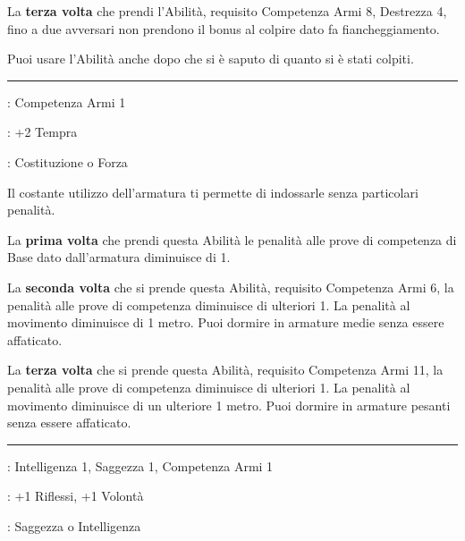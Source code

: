 \begin{multicols}{2}
La \textbf{terza volta} che prendi l'Abilità, requisito Competenza Armi 8, Destrezza 4, fino a due avversari non prendono il bonus al colpire dato fa fiancheggiamento.

Puoi usare l'Abilità anche dopo che si è saputo di quanto si è stati colpiti.

\smallskip\noindent\rule{\linewidth}{2pt} \hypertarget{Seconda pelle}{}\medskip{}
\noindent
\begin{description}[noitemsep, topsep=0pt, parsep=0pt, partopsep=0pt, leftmargin=0cm, labelwidth=2.5cm]
    \item[\textbf{Requisito}]: Competenza Armi 1
    \item[\textbf{Tiri Salvezza}]: +2 Tempra
    \item[\textbf{Caratteristica}]: Costituzione o Forza
\end{description}

Il costante utilizzo dell'armatura ti permette di indossarle senza particolari penalità.

La \textbf{prima volta} che prendi questa Abilità le penalità alle prove di competenza di Base dato dall'armatura diminuisce di 1.

La \textbf{seconda volta} che si prende questa Abilità, requisito Competenza Armi 6, la penalità alle prove di competenza diminuisce di ulteriori 1. La penalità al movimento diminuisce di 1 metro. Puoi dormire in armature medie senza essere affaticato.

La \textbf{terza volta} che si prende questa Abilità, requisito Competenza Armi 11, la penalità alle prove di competenza diminuisce di ulteriori 1. La penalità al movimento diminuisce di un ulteriore 1 metro. Puoi dormire in armature pesanti senza essere affaticato.

\smallskip\noindent\rule{\linewidth}{2pt} \hypertarget{Segugio}{}\medskip{}
\noindent
\begin{description}[noitemsep, topsep=0pt, parsep=0pt, partopsep=0pt, leftmargin=0cm, labelwidth=2.5cm]
    \item[\textbf{Requisito}]: Intelligenza 1, Saggezza 1, Competenza Armi 1
    \item[\textbf{Tiri Salvezza}]: +1 Riflessi, +1 Volontà
    \item[\textbf{Caratteristica}]: Saggezza o Intelligenza
\end{description}


\end{multicols}
